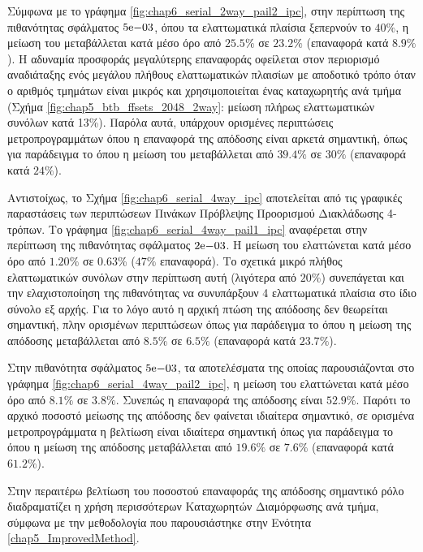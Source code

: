 Σύμφωνα με το γράφημα \ref{fig:chap6_serial_2way_pail2_ipc}, στην περίπτωση της πιθανότητας σφάλματος $5\mathrm{e}{-03}$, όπου τα ελαττωματικά πλαίσια ξεπερνούν το $40\%$, η μείωση του \ipc μεταβάλλεται κατά μέσο όρο από $25.5\%$ σε $23.2\%$ (επαναφορά κατά $8.9\%$). Η αδυναμία προσφοράς μεγαλύτερης επαναφοράς οφείλεται στον περιορισμό αναδιάταξης ενός μεγάλου πλήθους ελαττωματικών πλαισίων με αποδοτικό τρόπο όταν ο αριθμός τμημάτων είναι μικρός και χρησιμοποιείται ένας καταχωρητής ανά τμήμα (Σχήμα \ref{fig:chap5_btb_ffsets_2048_2way}: μείωση πλήρως ελαττωματικών συνόλων κατά 13\%). Παρόλα αυτά, υπάρχουν ορισμένες περιπτώσεις μετροπρογραμμάτων όπου η επαναφορά της απόδοσης είναι αρκετά σημαντική, όπως για παράδειγμα το  όπου η μείωση του \ipc μεταβάλλεται από $39.4\%$ σε $30\%$ (επαναφορά κατά $24\%$).
\par
Αντιστοίχως, το Σχήμα \ref{fig:chap6_serial_4way_ipc} αποτελείται από τις γραφικές παραστάσεις των περιπτώσεων Πινάκων Πρόβλεψης Προορισμού Διακλάδωσης 4-τρόπων. Το γράφημα \ref{fig:chap6_serial_4way_pail1_ipc} αναφέρεται στην περίπτωση της πιθανότητας σφάλματος $2\mathrm{e}{-03}$. H μείωση του \ipc ελαττώνεται κατά μέσο όρο από $1.20\%$ σε $0.63$\% ($47\%$ επαναφορά). Το σχετικά μικρό πλήθος ελαττωματικών συνόλων στην περίπτωση αυτή (λιγότερα από $20\%$) συνεπάγεται και την ελαχιστοποίηση της πιθανότητας να συνυπάρξουν 4 ελαττωματικά πλαίσια στο ίδιο σύνολο εξ αρχής. Για το λόγο αυτό η αρχική πτώση της απόδοσης δεν θεωρείται σημαντική, πλην ορισμένων περιπτώσεων όπως για παράδειγμα το  όπου η μείωση της απόδοσης μεταβάλλεται από $8.5\%$ σε $6.5\%$ (επαναφορά κατά $23.7\%$).
\par
Στην πιθανότητα σφάλματος $5\mathrm{e}{-03}$, τα αποτελέσματα της οποίας παρουσιάζονται στο γράφημα \ref{fig:chap6_serial_4way_pail2_ipc}, η μείωση του \ipc ελαττώνεται κατά μέσο όρο από $8.1\%$ σε $3.8\%$. Συνεπώς η επαναφορά της απόδοσης είναι $52.9\%$. Παρότι το αρχικό ποσοστό μείωσης της απόδοσης δεν φαίνεται ιδιαίτερα σημαντικό, σε ορισμένα μετροπρογράμματα η βελτίωση είναι ιδιαίτερα σημαντική όπως για παράδειγμα το  όπου η μείωση της απόδοσης μεταβάλλεται από $19.6\%$ σε $7.6\%$ (επαναφορά κατά $61.2\%$).
\par
Στην περαιτέρω βελτίωση του ποσοστού επαναφοράς της απόδοσης σημαντικό ρόλο διαδραματίζει η χρήση περισσότερων Καταχωρητών Διαμόρφωσης ανά τμήμα, σύμφωνα με την μεθοδολογία που παρουσιάστηκε στην Ενότητα \ref{chap5_ImprovedMethod}.

